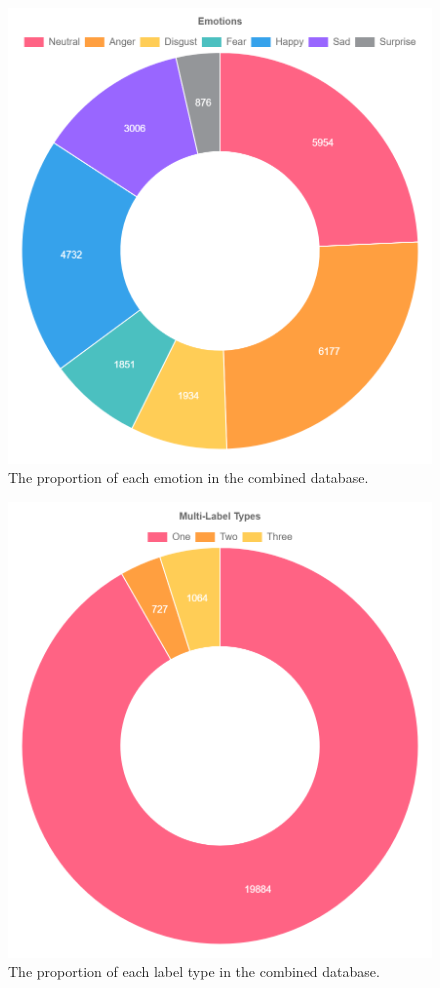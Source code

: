 \documentclass[conference]{IEEEtran}
\begin{document}
\begin{figure}[h!]
	\centering
	\hspace{6mm}
	\includegraphics[width=\linewidth]{combined_db_emotions.png} 
	\caption{The proportion of each emotion in the combined database.}
	\label{fig:combined_db_emotions}
\end{figure}

\begin{figure}[h!]
	\centering
	\hspace{6mm}
	\includegraphics[width=\linewidth]{combined_db_label_types.png} 
	\caption{The proportion of each label type in the combined database.}
	\label{fig:combined_db_label_types}
\end{figure}
\end{document}
